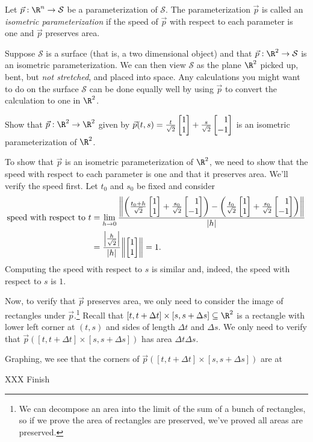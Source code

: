 \begin{definition}
	Let $\vec p:\R^n\to\mathcal S$ be a parameterization of $\mathcal S$.  The parameterization
	$\vec p$ is called an \emph{isometric parameterization} if the speed of $\vec p$ with
	respect to each parameter is one and $\vec p$ preserves area.
\end{definition}

Suppose $\mathcal S$ is a surface (that is, a two dimensional object) and that $\vec p:\R^2\to\mathcal S$
is an isometric parameterization.  We can then view $\mathcal S$ as the plane $\R^2$ picked up, bent, 
but \emph{not stretched}, and placed into space.  Any calculations you might want to do on 
the surface $\mathcal S$ can be done equally well by using $\vec p$ to convert the calculation
to one in $\R^2$.

\begin{example}
	Show that $\vec p:\R^2\to\R^2$ given by $\vec p(t,s)=\tfrac{t}{\sqrt{2}}\mat{1\\1}+\tfrac{s}{\sqrt{2}}\mat{1\\-1}$
	is an isometric parameterization of $\R^2$.

	To show that $\vec p$ is an isometric parameterization of $\R^2$, we need to show that the speed with respect
	to each parameter is one and that it preserves area.  We'll verify the speed first.
	Let $t_0$ and $s_0$ be fixed and consider
	\begin{align*}
		\text{speed with respect to $t$} &= \lim_{h\to 0} 
		\frac{\norm*{\left(\tfrac{t_0+h}{\sqrt{2}} \mat{1\\1} + \tfrac{s_0}{\sqrt{2}}\mat{1\\-1}\right)
		-\left(\tfrac{t_0}{\sqrt{2}} \mat{1\\1} + \tfrac{s_0}{\sqrt{2}}\mat{1\\-1}\right)}
		}{\abs{h}}\\
		&= \frac{\abs*{\tfrac{h}{\sqrt{2}}}}{\abs{h}}\norm*{\mat{1\\1}} = 1.
	\end{align*}
	Computing the speed with respect to $s$ is similar and, indeed, the speed with
	respect to $s$ is $1$.

	Now, to verify that $\vec p$ preserves area, we only need to consider the image
	of rectangles under $\vec p$.\footnote{
		We can decompose an area into the limit of the sum of a bunch of
		rectangles, so if we prove the area of rectangles are preserved, we've 
		proved all areas are preserved.}
	Recall that $[t,t+\Delta t]\times[s,s+\Delta s]\subseteq\R^2$ is a rectangle with 
	lower left corner at $(t,s)$ and sides of length $\Delta t$ and $\Delta s$.
	We only need to verify
	that $\vec p([t,t+\Delta t]\times[s,s+\Delta s])$ has area $\Delta t\Delta s$.

	Graphing, we see that the corners of $\vec p([t,t+\Delta t]\times[s,s+\Delta s])$ are at

	XXX Finish
\end{example}

